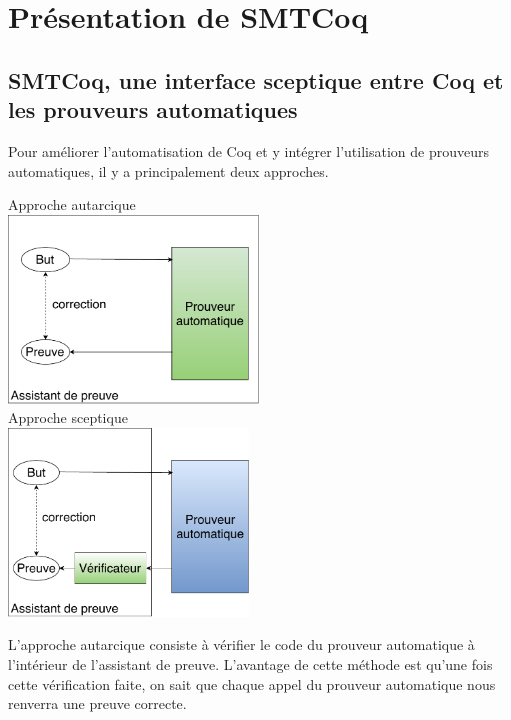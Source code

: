\documentclass[11pt]{article}
\begin{document}
\section{Présentation de SMTCoq} \label{pres_smtcoq}

\subsection{SMTCoq, une interface sceptique entre Coq et les prouveurs automatiques}\label{sceptique_autarcique}

Pour améliorer l'automatisation de Coq et y intégrer l'utilisation de prouveurs automatiques, il y a principalement deux approches.

\begin{multicols}{2}
\begin{center}
Approche autarcique\\
\includegraphics[height=5cm]{1_Autarcique.pdf}\\
Approche sceptique\\
\includegraphics[height=5cm]{2_Sceptique.pdf}\\

\end{center}
\end{multicols}

L'approche autarcique consiste à vérifier le code du prouveur automatique à l'intérieur de l'assistant de preuve. L'avantage de cette méthode est qu'une fois cette vérification faite, on sait que chaque appel du prouveur automatique nous renverra une preuve correcte. \\
\end{document}
